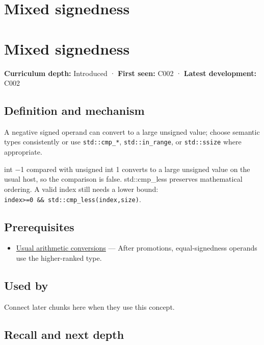 \hypertarget{appendix-736a2345de4a}{}
\section*{Mixed signedness}
\section{Mixed signedness}\label{mixed-signedness}

\textbf{Curriculum depth:} Introduced · \textbf{First seen:} C002 · \textbf{Latest development:} C002

\subsection{Definition and mechanism}\label{definition-and-mechanism}

A negative signed operand can convert to a large unsigned value; choose semantic types consistently or use \texttt{std::cmp\_*}, \texttt{std::in\_range}, or \texttt{std::ssize} where appropriate.

int −1 compared with unsigned int 1 converts to a large unsigned value on the usual host, so the comparison is false. std::cmp\_less preserves mathematical ordering. A valid index still needs a lower bound: \texttt{index\textgreater{}=0\ \&\&\ std::cmp\_less(index,size)}.

\subsection{Prerequisites}\label{prerequisites}

\begin{itemize}
\tightlist
\item
  \hyperref[appendix-5e2d663adf7f]{Usual arithmetic conversions} --- After promotions, equal-signedness operands use the higher-ranked type.
\end{itemize}

\subsection{Used by}\label{used-by}

Connect later chunks here when they use this concept.

\subsection{Recall and next depth}\label{recall-and-next-depth}

